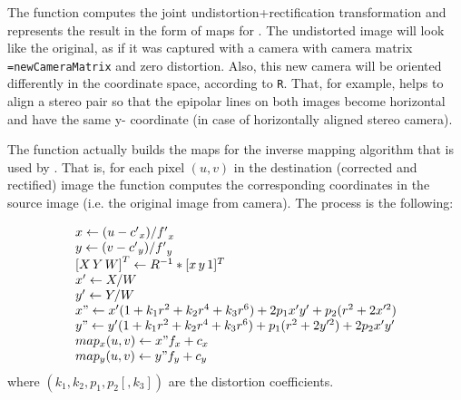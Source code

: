 \begin{description}
\end{description}

The function computes the joint undistortion+rectification transformation and represents the result in the form of maps for . The undistorted image will look like the original, as if it was captured with a camera with camera matrix \texttt{=newCameraMatrix} and zero distortion. Also, this new camera will be oriented differently in the coordinate space, according to \texttt{R}. That, for example, helps to align a stereo pair so that the epipolar lines on both images become horizontal and have the same y- coordinate (in case of horizontally aligned stereo camera).

The function actually builds the maps for the inverse mapping algorithm that is used by . That is, for each pixel $(u, v)$ in the destination (corrected and rectified) image the function computes the corresponding coordinates in the source image (i.e. the original image from camera). The process is the following:

\[
\begin{array}{l}
x \leftarrow (u - {c'}_x)/{f'}_x \\
y \leftarrow (v - {c'}_y)/{f'}_y \\
{[X\,Y\,W]}^T \leftarrow R^{-1}*[x\,y\,1]^T \\
x' \leftarrow X/W \\
y' \leftarrow Y/W \\
x" \leftarrow x' (1 + k_1 r^2 + k_2 r^4 + k_3 r^6) + 2p_1 x' y' + p_2(r^2 + 2 x'^2) \\
y" \leftarrow y' (1 + k_1 r^2 + k_2 r^4 + k_3 r^6) + p_1 (r^2 + 2 y'^2) + 2 p_2 x' y' \\
map_x(u,v) \leftarrow x" f_x + c_x \\
map_y(u,v) \leftarrow y" f_y + c_y
\end{array}
\]
where $(k_1, k_2, p_1, p_2[, k_3])$\label{4x1, 1x4, 5x1 or 1x5} are the distortion coefficients. 
 
